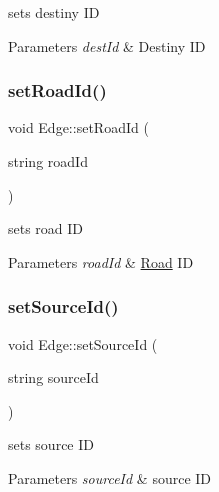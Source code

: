 sets destiny ID 


\begin{DoxyParams}{Parameters}
{\em dest\+Id} & Destiny ID \\
\hline
\end{DoxyParams}
\mbox{\label{class_edge_ae809dcc7008e45ca467a1bb9c0a3502d}} 
\subsubsection{\texorpdfstring{set\+Road\+Id()}{setRoadId()}}
{\footnotesize\ttfamily void Edge\+::set\+Road\+Id (\begin{DoxyParamCaption}\item[{string}]{road\+Id }\end{DoxyParamCaption})\hspace{0.3cm}{\ttfamily [inline]}}



sets road ID 


\begin{DoxyParams}{Parameters}
{\em road\+Id} & \mbox{\hyperlink{class_road}{Road}} ID \\
\hline
\end{DoxyParams}
\mbox{\label{class_edge_a05e8ecd6061e3c204c78f926abea49df}} 
\subsubsection{\texorpdfstring{set\+Source\+Id()}{setSourceId()}}
{\footnotesize\ttfamily void Edge\+::set\+Source\+Id (\begin{DoxyParamCaption}\item[{string}]{source\+Id }\end{DoxyParamCaption})\hspace{0.3cm}{\ttfamily [inline]}}



sets source ID 


\begin{DoxyParams}{Parameters}
{\em source\+Id} & source ID \\
\hline
\end{DoxyParams}
\mbox{\label{class_edge_a4f34b96f079b6cf55741827fa4ce3a91}} 
